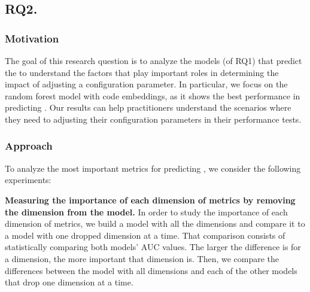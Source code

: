 
\subsection*{\textbf{RQ2. \RQIII}}
\label{sec:rq3}


\subsubsection*{Motivation}
The goal of this research question is to analyze the models (of RQ1) that predict the \inconsistent to understand the factors that play important roles in determining the impact of adjusting a configuration parameter. In particular, we focus on the random forest model with code embeddings, as it shows the best performance in predicting \inconsistent. 
Our results can help practitioners understand the scenarios where they need to adjusting their configuration parameters in their performance tests.

\subsubsection*{Approach}


To analyze the most important metrics for predicting \inconsistent, we consider the following experiments:

\noindent\textbf{Measuring the importance of each dimension of metrics by removing the dimension from the model.} 
In order to study the importance of each dimension of metrics, we build a model with all the dimensions and compare it to a model with one dropped dimension at a time. That comparison consists of statistically comparing both models' AUC values. The larger the difference is for a dimension, the more important that dimension is. Then, we compare the differences between the model with all dimensions and each of the other models that drop one dimension at a time. 

